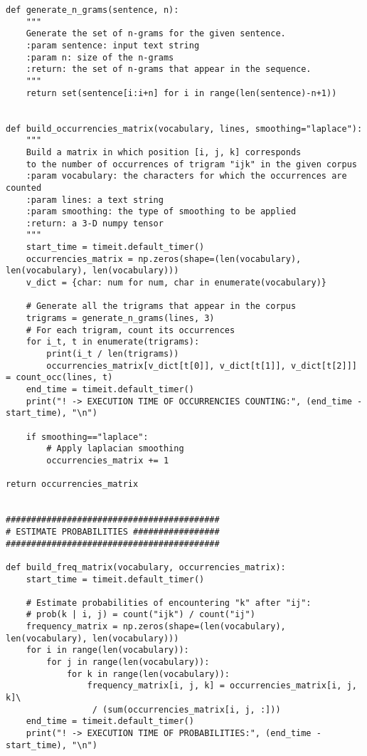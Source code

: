 \documentclass[
12pt,
a4paper,
oneside,
headinclude,
footinclude]{article}
\theoremstyle{definition} %
\begin{document}
\begin{verbatim}
def generate_n_grams(sentence, n):
    """
    Generate the set of n-grams for the given sentence.
    :param sentence: input text string
    :param n: size of the n-grams
    :return: the set of n-grams that appear in the sequence.
    """
    return set(sentence[i:i+n] for i in range(len(sentence)-n+1))


def build_occurrencies_matrix(vocabulary, lines, smoothing="laplace"):
    """
    Build a matrix in which position [i, j, k] corresponds
    to the number of occurrences of trigram "ijk" in the given corpus
    :param vocabulary: the characters for which the occurrences are counted
    :param lines: a text string
    :param smoothing: the type of smoothing to be applied
    :return: a 3-D numpy tensor
    """
    start_time = timeit.default_timer()
    occurrencies_matrix = np.zeros(shape=(len(vocabulary), len(vocabulary), len(vocabulary)))
    v_dict = {char: num for num, char in enumerate(vocabulary)}

    # Generate all the trigrams that appear in the corpus
    trigrams = generate_n_grams(lines, 3)
    # For each trigram, count its occurrences
    for i_t, t in enumerate(trigrams):
        print(i_t / len(trigrams))
        occurrencies_matrix[v_dict[t[0]], v_dict[t[1]], v_dict[t[2]]] = count_occ(lines, t)
    end_time = timeit.default_timer()
    print("! -> EXECUTION TIME OF OCCURRENCIES COUNTING:", (end_time - start_time), "\n")
    
    if smoothing=="laplace":
        # Apply laplacian smoothing
        occurrencies_matrix += 1

return occurrencies_matrix
    
    
##########################################
# ESTIMATE PROBABILITIES #################
##########################################

def build_freq_matrix(vocabulary, occurrencies_matrix):
    start_time = timeit.default_timer()
    
    # Estimate probabilities of encountering "k" after "ij":
    # prob(k | i, j) = count("ijk") / count("ij")
    frequency_matrix = np.zeros(shape=(len(vocabulary), len(vocabulary), len(vocabulary)))
    for i in range(len(vocabulary)):
        for j in range(len(vocabulary)):
            for k in range(len(vocabulary)):
                frequency_matrix[i, j, k] = occurrencies_matrix[i, j, k]\
                 / (sum(occurrencies_matrix[i, j, :]))
    end_time = timeit.default_timer()
    print("! -> EXECUTION TIME OF PROBABILITIES:", (end_time - start_time), "\n")
    

\end{verbatim}
\end{document}
